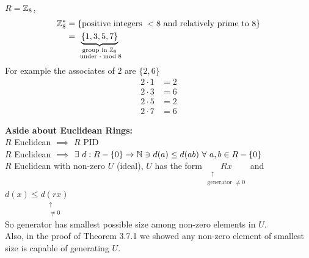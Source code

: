 \begin{example}
    $R={\mathbb{ Z}}_8$, 
    \begin{align*}
        {\mathbb{ Z}}_8^* &= \{\text{positive integers }<8 \text{ and relatively prime to }8\} \\
        &=\underbrace{\{1,3,5,7\}}_{\substack{ \text{group in }{\mathbb{ Z}}_8 \\ \text{ under }\cdot \bmod 8}}
    \end{align*}
    For example the associates of $2$ are $\{2,6\}$
    \begin{align*}
        2\cdot 1 &= 2 \\
        2\cdot 3 &= 6 \\
        2\cdot 5 &= 2 \\
        2\cdot 7 &= 6 
    \end{align*}
\end{example}
\begin{tcolorbox}
    \textbf{Aside about Euclidean Rings:} \\ \steezybreak
    $R$ Euclidean $\implies$ $R$ PID \\
    $R$ Euclidean $\implies$ $\exists \ d: R-\{0\}\rightarrow {\mathbb{ N}} \ni d(a)\leq d(ab) \ \forall \ a,b\in R-\{0\}$ \\
    $R$ Euclidean with non-zero $U$ (ideal), $U$ has the form $\underset{\substack{\ \ \  \uparrow \\ \text{generator }\neq 0}}{Rx}$ and $d(x)\leq \underset{\substack{\uparrow \\ \neq 0}}{d(rx)}$\\
    So generator has smallest possible size among non-zero elements in $U$. \\
    Also, in the proof of Theorem 3.7.1 we showed any non-zero element of smallest size is capable of generating $U$.
\end{tcolorbox}

